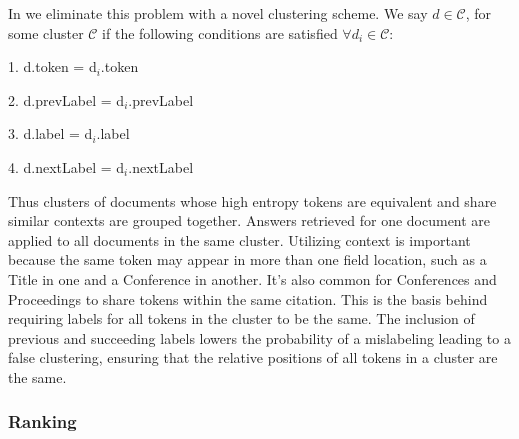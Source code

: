 In \sysName we eliminate this problem with a novel clustering scheme.  We say $d\in\mathcal{C}$, for some cluster $\mathcal{C}$ if the following conditions are satisfied $\forall d_{i}\in\mathcal{C}$:

1. d.token = d$_{i}$.token

2. d.prevLabel = d$_{i}$.prevLabel

3. d.label = d$_{i}$.label

4. d.nextLabel = d$_{i}$.nextLabel 

Thus clusters of documents whose high entropy tokens are equivalent and share similar contexts are grouped together.  Answers retrieved for one document are applied to all documents in the same cluster.  Utilizing context is important because the same token may appear in more than one field location, such as a Title in one and a Conference in another.  It's also common for Conferences and Proceedings to share tokens within the same citation.  This is the basis behind requiring labels for all tokens in the cluster to be the same.  The inclusion of previous and succeeding labels lowers the probability of a mislabeling leading to a false clustering, ensuring that the relative positions of all tokens in a cluster are the same.

\subsubsection{Ranking}
